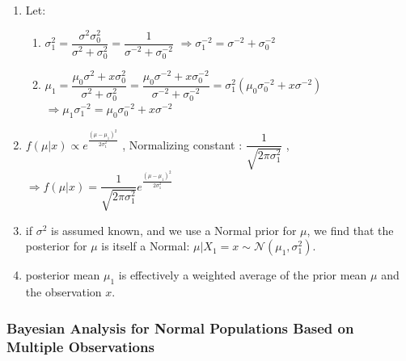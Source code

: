 \begin{enumerate}
    \item Let:
    \begin{enumerate}
        \item $
            \sigma^2_1 
            = \dfrac{\sigma^2\sigma^2_0}{ \sigma^2 + \sigma^2_0} 
            = \dfrac{1}{ \sigma^{-2} + \sigma^{-2}_0}
        $
        $
            \Rightarrow \sigma^{-2}_1 = \sigma^{-2} + \sigma^{-2}_0
        $
        \hfill \cite{statistics/book/Statistics-for-Data-Scientists/Maurits-Kaptein}

        \item $
            \mu_1 
            = \dfrac{\mu_0\sigma^2 + x\sigma^2 _0 }{\sigma^2 + \sigma^2_0}
            = \dfrac{\mu_0\sigma^{-2} + x\sigma^{-2}_0}{\sigma^{-2} + \sigma^{-2}_0}
            = \sigma^2 _1 (\mu_0\sigma^{-2}_0 + x\sigma^{-2})
        $
        $
            \Rightarrow \mu_1\sigma^{-2}_1 = \mu_0\sigma^{-2}_0 + x\sigma^{-2}
        $
        \hfill \cite{statistics/book/Statistics-for-Data-Scientists/Maurits-Kaptein}
    \end{enumerate}

    \item $f (\mu|x) \propto e ^{\tfrac{(\mu-\mu_1)^2} {2\sigma^2_1}}$
    , Normalizing constant : $\dfrac{1}{\sqrt{2\pi\sigma^2_1}}$
    , $\Rightarrow f (\mu|x) = \dfrac{1}{\sqrt{2\pi\sigma^2_1}} e ^{\tfrac{(\mu-\mu_1)^2} {2\sigma^2_1}}$
    \hfill \cite{statistics/book/Statistics-for-Data-Scientists/Maurits-Kaptein}

    \item  if $\sigma^2$ is assumed known, and we use a Normal prior for $\mu$, we find that the posterior for $\mu$ is itself a Normal: $\mu|X_1 = x \sim \mathcal{N} (\mu_1, \sigma^2_1 )$.
    \hfill \cite{statistics/book/Statistics-for-Data-Scientists/Maurits-Kaptein}

    \item posterior mean $\mu_1$ is effectively a weighted average of the prior mean $\mu$ and the observation $x$.
    \hfill \cite{statistics/book/Statistics-for-Data-Scientists/Maurits-Kaptein}
\end{enumerate}


\subsubsection{Bayesian Analysis for Normal Populations Based on Multiple Observations}

